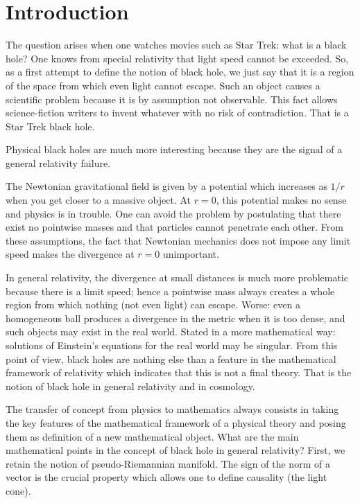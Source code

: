 
\section{Introduction}

The question arises when one watches movies such as Star Trek: what is a black hole? One knows from special relativity that light speed cannot be exceeded. So, as a first attempt to define the notion of black hole, we just say that it is a region of the space from which even light cannot escape. Such an object causes a scientific problem because it is by assumption not observable. This fact allows science-fiction writers to invent whatever with no risk of contradiction. That is a Star Trek black hole.

Physical black holes are much more interesting because they are the signal of a general relativity failure.

The Newtonian gravitational field is given by a potential which increases as $1/r$ when you get closer to a massive object. At $r=0$, this potential makes no sense and physics is in trouble. One can avoid the problem by postulating that there exist no pointwise masses and that particles cannot penetrate each other. From these assumptions, the fact that Newtonian mechanics does not impose any limit speed makes the divergence at $r=0$ unimportant.

In general relativity, the divergence at small distances is much more problematic because there is a limit speed; hence a pointwise mass always creates a whole region from which nothing (not even light) can escape. Worse: even a homogeneous ball produces a divergence in the metric when it is too dense, and such objects may exist in the real world. Stated in a more mathematical way: solutions of Einstein's equations for the real world may be singular. From this point of view, black holes are nothing else than a feature in the mathematical framework of relativity which indicates that this is not a final theory. That is the notion of black hole in general relativity and in cosmology.

The transfer of concept from physics to mathematics always consists in taking the key features of the mathematical framework of a physical theory and posing them as definition of a new mathematical object. What are the main mathematical points in the concept of black hole in general relativity? 
First, we retain the notion of pseudo-Riemannian manifold. The sign of the norm of a vector is the crucial property which allows one to define causality (the light cone).

